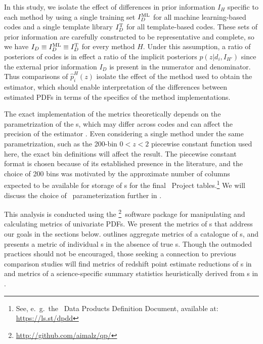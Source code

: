 In this study, we isolate the effect of differences in prior information $I_{H}$ specific to each method by using a single training set $I_{D}^{\rm ML}$ for all machine learning-based codes and a single template library $I_{D}^{\rm T}$ for all template-based codes.
These sets of prior information are carefully constructed to be representative and complete, so we have $I_{D} \equiv I_{D}^{\rm ML} \equiv I_{D}^{\rm T}$ for every method $H$.
Under this assumption, a ratio of posteriors of codes is in effect a ratio of the implicit posteriors $p(z \vert d_{i}, I_{H'})$ since the external prior information $I_{D}$ is present in the numerator and denominator.
Thus comparisons of $\hat{p}_{i}^{H}(z)$ isolate the effect of the method used to obtain the estimator, which should enable interpretation of the differences between estimated PDFs in terms of the specifics of the method implementations.

The exact implementation of the metrics theoretically depends on the parametrization of the \pzpdf s, which may differ across codes and can affect the precision of the estimator \citep{Malz:qp}.
Even considering a single method under the same parametrization, such as the 200-bin $0 < z < 2$ piecewise constant function used here, the exact bin definitions will affect the result.
The piecewise constant format is chosen because of its established presence in the literature, and the choice of 200 bins was motivated by the approximate number of columns expected to be available for storage of \pzpdf s for the final \lsst\ Project tables.\footnote{See, e.~g.~the \lsst\ Data Products Definition Document, available at: \url{https://ls.st/dpdd}}
We will discuss the choice of \pzpdf\ parameterization further in .

This analysis is conducted using the \qp\footnote{\url{http://github.com/aimalz/qp/}}\ software package \citep{Malz:qp} for manipulating and calculating metrics of univariate PDFs.
We present the metrics of \pzpdf s that address our goals in the sections below.
 outlines aggregate metrics of a catalogue of \pzpdf s, and  presents a metric of individual \pzpdf s in the absence of true \pzpdf s.
Though the outmoded practices should not be encouraged, those seeking a connection to previous comparison studies will find metrics of redshift point estimate reductions of \pzpdf s in  and metrics of a science-specific summary statistics heuristically derived from \pzpdf s in .

